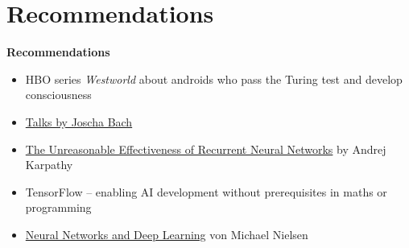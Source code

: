 \documentclass[12pt,compress,english,utf8,t]{beamer}
\renewcommand{\_}{\mathpunct{.}\,}
\newcommand{\hil}[1]{{\usebeamercolor[fg]{item}{\textbf{#1}}}}
\begin{document}
\section{Recommendations}

{
\begin{frame}
  \centering
  \bigskip\bigskip

  \Huge \hil{Part V}

  \bigskip
  \Large\textbf{Recommendations}
  \par

  \vfill\small
  \begin{itemize}
    \item HBO series \emph{Westworld} about androids who pass the Turing test
    and develop consciousness
    \item \href{https://www.youtube.com/watch?v=lKQ0yaEJjok}{Talks by
    Joscha Bach}
    \item \href{https://karpathy.github.io/2015/05/21/rnn-effectiveness/}{The
    Unreasonable Effectiveness of Recurrent Neural Networks} by Andrej
    Karpathy
    \item TensorFlow -- enabling AI development without prerequisites in maths or programming
    \item \href{http://neuralnetworksanddeeplearning.com/}{Neural Networks and Deep Learning} von Michael Nielsen
  \end{itemize}
\end{frame}}
\end{document}
